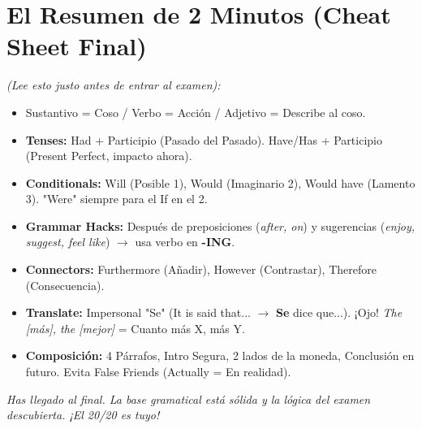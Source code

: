\documentclass[11pt,a4paper]{article}
\begin{document}
\section{El Resumen de 2 Minutos (Cheat Sheet Final)}
\textit{(Lee esto justo antes de entrar al examen):}
\begin{itemize}[noitemsep]
    \item Sustantivo = Coso / Verbo = Acción / Adjetivo = Describe al coso.
    \item \textbf{Tenses:} Had + Participio (Pasado del Pasado). Have/Has + Participio (Present Perfect, impacto ahora).
    \item \textbf{Conditionals:} Will (Posible 1), Would (Imaginario 2), Would have (Lamento 3). "Were" siempre para el If en el 2.
    \item \textbf{Grammar Hacks:} Después de preposiciones (\textit{after, on}) y sugerencias (\textit{enjoy, suggest, feel like}) $\to$ usa verbo en \textbf{-ING}.
    \item \textbf{Connectors:} Furthermore (Añadir), However (Contrastar), Therefore (Consecuencia).
    \item \textbf{Translate:} Impersonal "Se" (It is said that... $\to$ \textbf{Se} dice que...). ¡Ojo! \textit{The [más], the [mejor]} = Cuanto más X, más Y.
    \item \textbf{Composición:} 4 Párrafos, Intro Segura, 2 lados de la moneda, Conclusión en futuro. Evita False Friends (Actually = En realidad).
\end{itemize}

\vspace{0.8cm}
\begin{center}
    \textit{Has llegado al final. La base gramatical está sólida y la lógica del examen descubierta. ¡El 20/20 es tuyo!}
\end{center}
\end{document}
